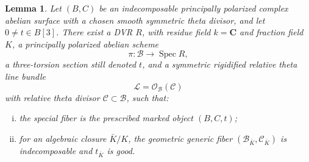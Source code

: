 \documentclass[12pt]{amsart}
\numberwithin{equation}{section}
\newtheorem{lemma}[theorem]{Lemma}
\theoremstyle{definition}
\theoremstyle{remark}
\newcommand{\C}{\mathbf C}
\newcommand{\Spec}{\operatorname{Spec}}
\begin{document}
\begin{lemma}\label{lem:13-good-deformation}
Let $(B,C)$ be an indecomposable principally polarized complex
abelian surface with a chosen smooth symmetric theta divisor, and let
$0\ne t\in B[3]$.  There exist a DVR $R$, with residue field
$k=\C$ and fraction field $K$, a principally polarized abelian scheme
\[
\pi:\mathscr B\to\Spec R,
\]
a three-torsion section still denoted $t$, and a symmetric rigidified
relative theta line bundle
\[
\mathscr L=\mathcal O_{\mathscr B}(\mathscr C)
\]
with relative theta divisor $\mathscr C\subset\mathscr B$, such that:

\begin{enumerate}[(i)]
\item the special fiber is the prescribed marked object $(B,C,t)$;
\item for an algebraic closure $\bar K/K$, the geometric generic fiber
$(\mathscr B_{\bar K},\mathscr C_{\bar K})$ is indecomposable and
$t_{\bar K}$ is good.
\end{enumerate}
\end{lemma}
\end{document}
